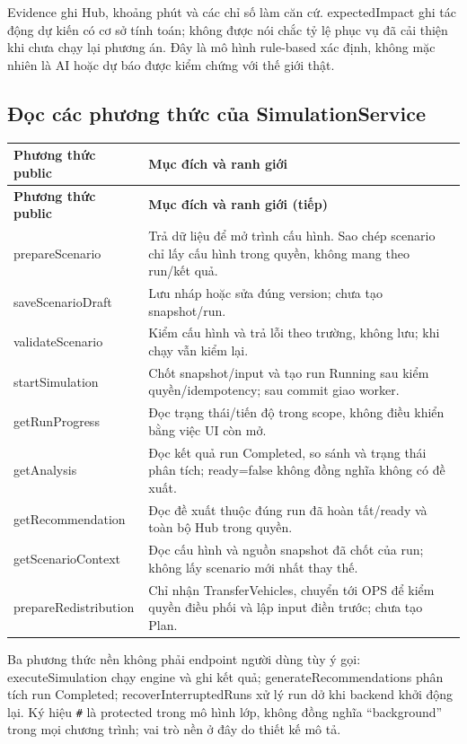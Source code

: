 \documentclass[12pt,a4paper]{article}
\newenvironment{PairTable}[2]{%
  \begin{longtable}{|L{39mm}|L{106mm}|}\hline
  \textbf{#1} & \textbf{#2}\\\hline\endfirsthead
  \hline\textbf{#1} & \textbf{#2 (tiếp)}\\\hline\endhead
}{\end{longtable}}
\begin{document}
Evidence ghi Hub, khoảng phút và các chỉ số làm căn cứ. expectedImpact ghi tác động dự kiến có cơ sở tính toán; không được nói chắc tỷ lệ phục vụ đã cải thiện khi chưa chạy lại phương án. Đây là mô hình rule-based xác định, không mặc nhiên là AI hoặc dự báo được kiểm chứng với thế giới thật.

\subsection{Đọc các phương thức của SimulationService}
\begin{PairTable}{Phương thức public}{Mục đích và ranh giới}
prepareScenario & Trả dữ liệu để mở trình cấu hình. Sao chép scenario chỉ lấy cấu hình trong quyền, không mang theo run/kết quả.\\\hline
saveScenarioDraft & Lưu nháp hoặc sửa đúng version; chưa tạo snapshot/run.\\\hline
validateScenario & Kiểm cấu hình và trả lỗi theo trường, không lưu; khi chạy vẫn kiểm lại.\\\hline
startSimulation & Chốt snapshot/input và tạo run Running sau kiểm quyền/idempotency; sau commit giao worker.\\\hline
getRunProgress & Đọc trạng thái/tiến độ trong scope, không điều khiển bằng việc UI còn mở.\\\hline
getAnalysis & Đọc kết quả run Completed, so sánh và trạng thái phân tích; ready=false không đồng nghĩa không có đề xuất.\\\hline
getRecommendation & Đọc đề xuất thuộc đúng run đã hoàn tất/ready và toàn bộ Hub trong quyền.\\\hline
getScenarioContext & Đọc cấu hình và nguồn snapshot đã chốt của run; không lấy scenario mới nhất thay thế.\\\hline
prepareRedistribution & Chỉ nhận TransferVehicles, chuyển tới OPS để kiểm quyền điều phối và lập input điền trước; chưa tạo Plan.\\\hline
\end{PairTable}

Ba phương thức nền không phải endpoint người dùng tùy ý gọi: executeSimulation chạy engine và ghi kết quả; generateRecommendations phân tích run Completed; recoverInterruptedRuns xử lý run dở khi backend khởi động lại. Ký hiệu \texttt{\#} là protected trong mô hình lớp, không đồng nghĩa ``background'' trong mọi chương trình; vai trò nền ở đây do thiết kế mô tả.
\end{document}
